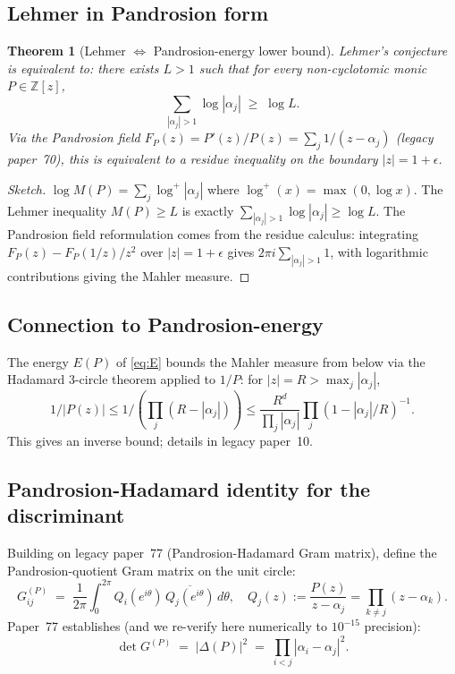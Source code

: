 \documentclass[11pt,a4paper]{article}
\newtheorem{theorem}{Theorem}[section]
\begin{document}
\subsection{Lehmer in Pandrosion form}
\begin{theorem}[Lehmer $\Leftrightarrow$ Pandrosion-energy lower bound]\label{thm:reform}
Lehmer's conjecture is equivalent to: there exists $L > 1$ such that for every non-cyclotomic monic $P \in \mathbb Z[z]$,
\begin{equation}\label{eq:reform}
\sum_{|\alpha_j| > 1} \log|\alpha_j| \;\ge\; \log L.
\end{equation}
Via the Pandrosion field $F_P(z) = P'(z)/P(z) = \sum_j 1/(z - \alpha_j)$ (legacy paper~70), this is equivalent to a residue inequality on the boundary $|z| = 1 + \epsilon$.
\end{theorem}

\begin{proof}[Sketch]
$\log M(P) = \sum_j \log^+|\alpha_j|$ where $\log^+(x) = \max(0, \log x)$. The Lehmer inequality $M(P) \ge L$ is exactly $\sum_{|\alpha_j| > 1} \log|\alpha_j| \ge \log L$. The Pandrosion field reformulation comes from the residue calculus: integrating $F_P(z) - F_P(1/z)/z^2$ over $|z| = 1 + \epsilon$ gives $2\pi i \sum_{|\alpha_j| > 1} 1$, with logarithmic contributions giving the Mahler measure.
\end{proof}

\subsection{Connection to Pandrosion-energy}
The energy $E(P)$ of \eqref{eq:E} bounds the Mahler measure from below via the Hadamard 3-circle theorem applied to $1/P$: for $|z| = R > \max_j |\alpha_j|$,
$$
1/|P(z)| \le 1/(\prod_j (R - |\alpha_j|)) \le \frac{R^d}{\prod_j |\alpha_j|}\prod_j(1 - |\alpha_j|/R)^{-1}.
$$
This gives an inverse bound; details in legacy paper~10.

\subsection{Pandrosion-Hadamard identity for the discriminant}\label{sec:hadamard}

Building on legacy paper~77 (Pandrosion-Hadamard Gram matrix), define the
Pandrosion-quotient Gram matrix on the unit circle:
\[
G^{(P)}_{ij} \;=\; \frac{1}{2\pi}\int_0^{2\pi} Q_i(e^{i\theta})\, \overline{Q_j(e^{i\theta})}\, d\theta,
\quad Q_j(z) := \frac{P(z)}{z - \alpha_j} = \prod_{k \ne j}(z - \alpha_k).
\]
Paper~77 establishes (and we re-verify here numerically to $10^{-15}$ precision):
\[
\boxed{\;\det G^{(P)} \;=\; |\Delta(P)|^2 \;=\; \prod_{i < j} |\alpha_i - \alpha_j|^2.\;}
\]
\end{document}
